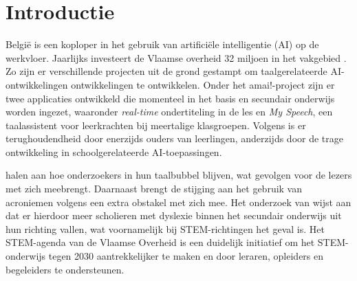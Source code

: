 
\section{Introductie}%
\label{sec:introductie}

België is een koploper in het gebruik van artificiële intelligentie (AI) op de werkvloer. Jaarlijks investeert de Vlaamse overheid 32 miljoen in het vakgebied \autocite{Crevits2022}. Zo zijn er verschillende projecten uit de grond gestampt om taalgerelateerde AI-ontwikkelingen ontwikkelingen te ontwikkelen. Onder het amai!-project  zijn er twee applicaties ontwikkeld die momenteel in het basis en secundair onderwijs worden ingezet, waaronder \textit{real-time} ondertiteling in de les en \textit{My Speech}, een taalassistent voor leerkrachten bij meertalige klasgroepen. Volgens \textcite{Martens2021} is er terughoudendheid door enerzijds ouders van leerlingen, anderzijds door de trage ontwikkeling in schoolgerelateerde AI-toepassingen.

\textcite{PlavenSigray2017} halen aan hoe onderzoekers in hun taalbubbel blijven, wat gevolgen voor de lezers met zich meebrengt. Daarnaast brengt de stijging aan het gebruik van acroniemen volgens \textcite{Barnett2020} een extra obstakel met zich mee. Het onderzoek van \textcite{Donato2022} wijst aan dat er hierdoor meer scholieren met dyslexie binnen het secundair onderwijs uit hun richting vallen, wat voornamelijk bij STEM-richtingen het geval is. Het STEM-agenda van de Vlaamse Overheid is een duidelijk initiatief om het STEM-onderwijs tegen 2030 aantrekkelijker te maken en door leraren, opleiders en begeleiders te ondersteunen.



